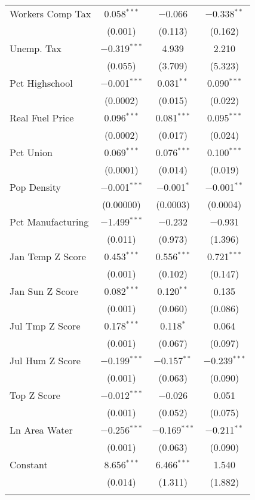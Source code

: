 \begin{table}[!htbp]
\begin{tabular}{@{\extracolsep{5pt}}lccc}
  Workers Comp Tax & 0.058$^{***}$ & $-$0.066 & $-$0.338$^{**}$ \\ 
  & (0.001) & (0.113) & (0.162) \\ 
  Unemp. Tax & $-$0.319$^{***}$ & 4.939 & 2.210 \\ 
  & (0.055) & (3.709) & (5.323) \\ 
  Pct Highschool & $-$0.001$^{***}$ & 0.031$^{**}$ & 0.090$^{***}$ \\ 
  & (0.0002) & (0.015) & (0.022) \\ 
  Real Fuel Price & 0.096$^{***}$ & 0.081$^{***}$ & 0.095$^{***}$ \\ 
  & (0.0002) & (0.017) & (0.024) \\ 
  Pct Union & 0.069$^{***}$ & 0.076$^{***}$ & 0.100$^{***}$ \\ 
  & (0.0001) & (0.014) & (0.019) \\ 
  Pop Density & $-$0.001$^{***}$ & $-$0.001$^{*}$ & $-$0.001$^{**}$ \\ 
  & (0.00000) & (0.0003) & (0.0004) \\ 
  Pct Manufacturing & $-$1.499$^{***}$ & $-$0.232 & $-$0.931 \\ 
  & (0.011) & (0.973) & (1.396) \\ 
  Jan Temp Z Score & 0.453$^{***}$ & 0.556$^{***}$ & 0.721$^{***}$ \\ 
  & (0.001) & (0.102) & (0.147) \\ 
  Jan Sun Z Score & 0.082$^{***}$ & 0.120$^{**}$ & 0.135 \\ 
  & (0.001) & (0.060) & (0.086) \\ 
  Jul Tmp Z Score & 0.178$^{***}$ & 0.118$^{*}$ & 0.064 \\ 
  & (0.001) & (0.067) & (0.097) \\ 
  Jul Hum Z Score & $-$0.199$^{***}$ & $-$0.157$^{**}$ & $-$0.239$^{***}$ \\ 
  & (0.001) & (0.063) & (0.090) \\ 
  Top Z Score & $-$0.012$^{***}$ & $-$0.026 & 0.051 \\ 
  & (0.001) & (0.052) & (0.075) \\ 
  Ln Area Water & $-$0.256$^{***}$ & $-$0.169$^{***}$ & $-$0.211$^{**}$ \\ 
  & (0.001) & (0.063) & (0.090) \\ 
  Constant & 8.656$^{***}$ & 6.466$^{***}$ & 1.540 \\ 
  & (0.014) & (1.311) & (1.882) \\ 
 \hline \\[-1.8ex] 

\end{tabular}
\end{table}

